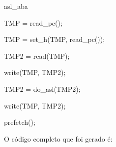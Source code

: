 \documentclass[letterpaper,10pt,brazil]{sphinxmanual}
\begin{document}
\begin{DUlineblock}{0em}
\item[] 
\item[] asl\_aba
\item[]
\begin{DUlineblock}{\DUlineblockindent}
\item[] TMP = read\_pc();
\item[] TMP = set\_h(TMP, read\_pc());
\item[] TMP2 = read(TMP);
\item[] write(TMP, TMP2);
\item[] TMP2 = do\_asl(TMP2);
\item[] write(TMP, TMP2);
\item[] prefetch();
\item[] 
\end{DUlineblock}
\end{DUlineblock}

O código completo que foi gerado é:
\end{document}
